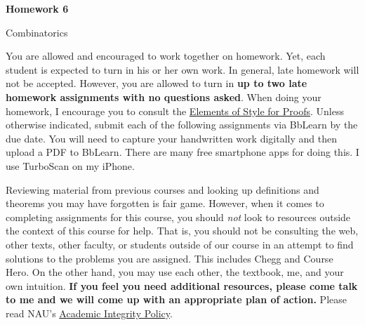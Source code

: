 \documentclass[11pt]{article}%
\theoremstyle{definition}
\newcommand{\blankline}{\pagebreak[2]\vspace{.5\baselineskip}}
\begin{document}
\begin{center}
{\Large\bf Homework 6}

\smallskip

Combinatorics
\end{center}

\thispagestyle{fancy}

You are allowed and encouraged to work together on homework. Yet, each student is expected to turn in his or her own work. In general, late homework will not be accepted. However, you are allowed to turn in \textbf{up to two late homework assignments with no questions asked}. When doing your homework, I encourage you to consult the \href{http://danaernst.com/teaching/ElementsOfStyle.pdf}{Elements of Style for Proofs}. Unless otherwise indicated, submit each of the following assignments via BbLearn by the due date. You will need to capture your handwritten work digitally and then upload a PDF to BbLearn. There are many free smartphone apps for doing this. I use TurboScan on my iPhone.

\blankline

Reviewing material from previous courses and looking up definitions and theorems you may have forgotten is fair game. However, when it comes to completing assignments for this course, you should \emph{not} look to resources outside the context of this course for help.  That is, you should not be consulting the web, other texts, other faculty, or students outside of our course in an attempt to find solutions to the problems you are assigned.  This includes Chegg and Course Hero. On the other hand, you may use each other, the textbook, me, and your own intuition. \textbf{If you feel you need additional resources, please come talk to me and we will come up with an appropriate plan of action.} Please read NAU's \href{https://www5.nau.edu/policies/Client/Details/828?whoIsLooking=Students&pertainsTo=All&sortDirection=Ascending&page=1}{Academic Integrity Policy}.

\blankline
\end{document}
